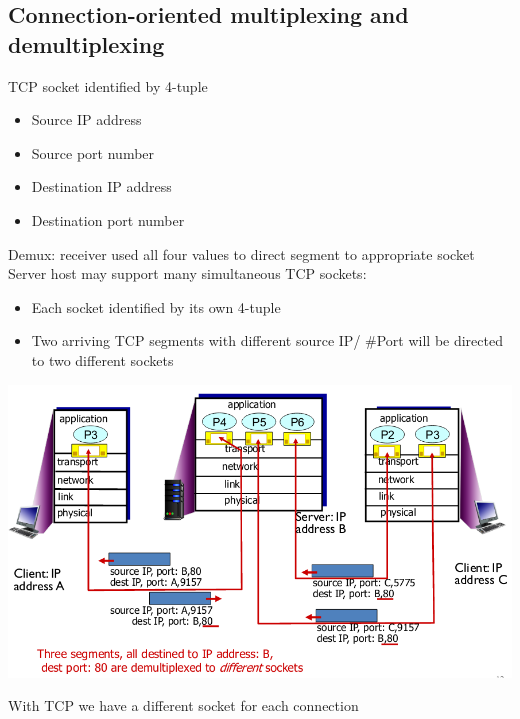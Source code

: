 \documentclass{article}[18pt]
\begin{document}
\subsection{Connection-oriented multiplexing and demultiplexing}
TCP socket identified by 4-tuple
\begin{itemize}
	\item Source IP address
	\item Source port number
	\item Destination IP address
	\item Destination port number
\end{itemize}
Demux: receiver used all four values to direct segment to appropriate socket\\
Server host may support many simultaneous TCP sockets:
\begin{itemize}
	\item Each socket identified by its own 4-tuple
	\item Two arriving TCP segments with different source IP/ \#Port will be directed to two different sockets
\end{itemize}
\begin{center}
	\includegraphics[scale=0.7]{connection}
\end{center}
\begin{important}
With TCP we have a different socket for each connection	
\end{important}
\end{document}
